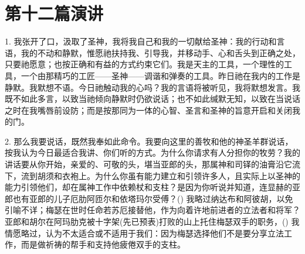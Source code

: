 

\section{第十二篇演讲}

\par

\par

1. 我张开了口，汲取了圣神，我将我自己和我的一切献给圣神：我的行动和言语，我的不动和静默，惟愿祂扶持我、引导我，并移动手、心和舌头到正确之处，只要祂愿意；也按正确和有益的方式约束它们。我是天主的工具，一个理性的工具，一个由那精巧的工匠——圣神——调谐和弹奏的工具。昨日祂在我内的工作是静默。我默想不语。今日祂触动我的心吗？我的言语将被听见，我将默想发言。我既不如此多言，以致当祂倾向静默时仍欲说话；也不如此缄默无知，以致在当说话之时在我嘴唇前设防；而是按那同为一体的心智、圣言和圣神的旨意开启和关闭我的门。\par

2. 那么我要说话，既然我奉如此命令。我要向这里的善牧和他的神圣羊群说话，按我认为今日最适合我讲、你们听的方式。为什么你请求有人分担你的牧劳？我的讲话要从你开始，亲爱的、可敬的头，堪当亚郎的头，那属神和司铎的油膏沿它流下，流到胡须和衣袍上。为什么你虽有能力建立和引领许多人，且实际上以圣神的能力引领他们，却在属神工作中依赖杖和支柱？是因为你听说并知道，连显赫的亚郎也有亚郎的儿子厄肋阿匝尔和依塔玛尔受傅？() 我略过纳达布和阿彼胡，以免引喻不详；梅瑟在世时任命若苏厄接替他，作为向着许地前进者的立法者和将军？亚郎和胡尔在阿玛肋克被十字架(先已预表)打败的山上托住梅瑟双手的职务，() 我情愿略过，认为不太适合或不适用于我们：因为梅瑟选择他们不是要分享立法工作，而是做祈祷的帮手和支持他疲倦双手的支柱。\par

